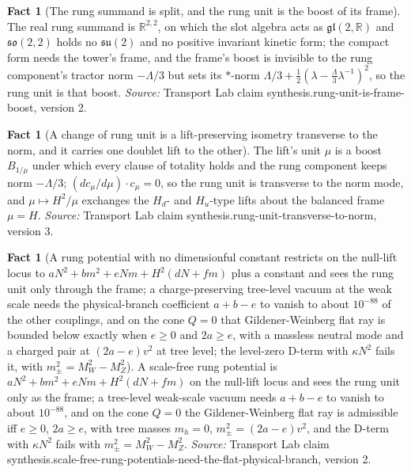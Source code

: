 \documentclass[11pt]{article}
\theoremstyle{definition}
\newtheorem{fact}[theorem]{Fact}
\theoremstyle{plain}
\providecommand{\R}{}\renewcommand{\R}{\mathbb{R}}
\providecommand{\gl}{}\renewcommand{\gl}{\mathfrak{gl}}
\providecommand{\so}{}\renewcommand{\so}{\mathfrak{so}}
\providecommand{\su}{}\renewcommand{\su}{\mathfrak{su}}
\begin{document}
\begin{fact}[The rung summand is split, and the rung unit is the boost of its frame]\label{c:synthesis.rung-unit-is-frame-boost}
The real rung summand is $\R^{2,2}$, on which the slot algebra acts as $\gl(2,\R)$ and $\so(2,2)$ holds no $\su(2)$ and no positive invariant kinetic form; the compact form needs the tower's frame, and the frame's boost is invisible to the rung component's tractor norm $-\Lambda/3$ but sets its $*$-norm $\Lambda/3 + \tfrac12(\lambda - \tfrac{\Lambda}{3}\lambda^{-1})^{2}$, so the rung unit is that boost.
\emph{Source:} Transport Lab claim synthesis.rung-unit-is-frame-boost, version 2.
\end{fact}

\begin{fact}[A change of rung unit is a lift-preserving isometry transverse to the norm, and it carries one doublet lift to the other]\label{c:synthesis.rung-unit-transverse-to-norm}
The lift's unit $\mu$ is a boost $B_{1/\mu}$ under which every clause of totality holds and the rung component keeps norm $-\Lambda/3$; $(dc_{\mu}/d\mu)\cdot c_{\mu} = 0$, so the rung unit is transverse to the norm mode, and $\mu \mapsto H^{2}/\mu$ exchanges the $H_{d}$- and $H_{u}$-type lifts about the balanced frame $\mu = H$.
\emph{Source:} Transport Lab claim synthesis.rung-unit-transverse-to-norm, version 3.
\end{fact}

\begin{fact}[A rung potential with no dimensionful constant restricts on the null-lift locus to $aN^{2} + bm^{2} + eNm + H^{2}(dN + fm)$ plus a constant and sees the rung unit only through the frame; a charge-preserving tree-level vacuum at the weak scale needs the physical-branch coefficient $a + b - e$ to vanish to about $10^{-88}$ of the other couplings, and on the cone $Q = 0$ that Gildener-Weinberg flat ray is bounded below exactly when $e \ge 0$ and $2a \ge e$, with a massless neutral mode and a charged pair at $(2a - e)v^{2}$ at tree level; the level-zero D-term with $\kappa N^{2}$ fails it, with $m_{\pm}^{2} = M_{W}^{2} - M_{Z}^{2}$]\label{c:synthesis.scale-free-rung-potentials-need-the-flat-physical-branch}
A scale-free rung potential is $aN^{2} + bm^{2} + eNm + H^{2}(dN + fm)$ on the null-lift locus and sees the rung unit only as the frame; a tree-level weak-scale vacuum needs $a + b - e$ to vanish to about $10^{-88}$, and on the cone $Q = 0$ the Gildener-Weinberg flat ray is admissible iff $e \ge 0$, $2a \ge e$, with tree masses $m_{h} = 0$, $m_{\pm}^{2} = (2a - e)v^{2}$, and the D-term with $\kappa N^{2}$ fails with $m_{\pm}^{2} = M_{W}^{2} - M_{Z}^{2}$.
\emph{Source:} Transport Lab claim synthesis.scale-free-rung-potentials-need-the-flat-physical-branch, version 2.
\end{fact}
\end{document}
